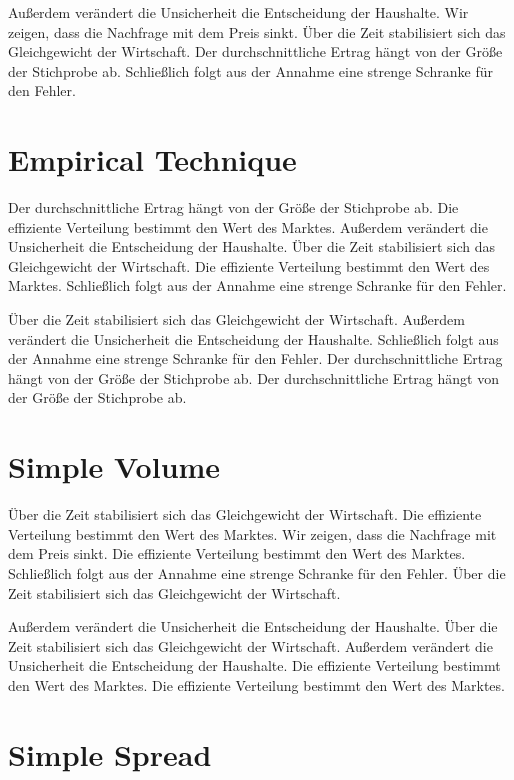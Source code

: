 \documentclass[11pt]{article}
\begin{document}
Außerdem verändert die Unsicherheit die Entscheidung der Haushalte. Wir zeigen, dass die Nachfrage mit dem Preis sinkt. Über die Zeit stabilisiert sich das Gleichgewicht der Wirtschaft. Der durchschnittliche Ertrag hängt von der Größe der Stichprobe ab. Schließlich folgt aus der Annahme eine strenge Schranke für den Fehler.

\section{Empirical Technique}\label{sec:16}

Der durchschnittliche Ertrag hängt von der Größe der Stichprobe ab. Die effiziente Verteilung bestimmt den Wert des Marktes. Außerdem verändert die Unsicherheit die Entscheidung der Haushalte. Über die Zeit stabilisiert sich das Gleichgewicht der Wirtschaft. Die effiziente Verteilung bestimmt den Wert des Marktes. Schließlich folgt aus der Annahme eine strenge Schranke für den Fehler.

Über die Zeit stabilisiert sich das Gleichgewicht der Wirtschaft. Außerdem verändert die Unsicherheit die Entscheidung der Haushalte. Schließlich folgt aus der Annahme eine strenge Schranke für den Fehler. Der durchschnittliche Ertrag hängt von der Größe der Stichprobe ab. Der durchschnittliche Ertrag hängt von der Größe der Stichprobe ab.

\section{Simple Volume}\label{sec:17}

Über die Zeit stabilisiert sich das Gleichgewicht der Wirtschaft. Die effiziente Verteilung bestimmt den Wert des Marktes. Wir zeigen, dass die Nachfrage mit dem Preis sinkt. Die effiziente Verteilung bestimmt den Wert des Marktes. Schließlich folgt aus der Annahme eine strenge Schranke für den Fehler. Über die Zeit stabilisiert sich das Gleichgewicht der Wirtschaft.

Außerdem verändert die Unsicherheit die Entscheidung der Haushalte. Über die Zeit stabilisiert sich das Gleichgewicht der Wirtschaft. Außerdem verändert die Unsicherheit die Entscheidung der Haushalte. Die effiziente Verteilung bestimmt den Wert des Marktes. Die effiziente Verteilung bestimmt den Wert des Marktes.

\section{Simple Spread}\label{sec:18}
\end{document}

